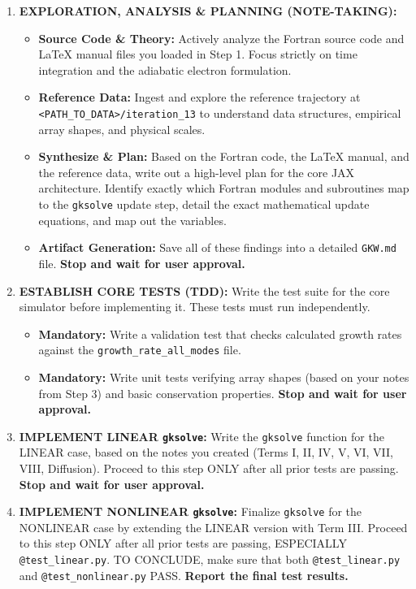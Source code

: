 \documentclass{article}
\theoremstyle{plain}
\theoremstyle{definition}
\theoremstyle{remark}
\begin{document}
\begin{promptbox}[]
\begin{enumerate}[leftmargin=*, noitemsep, topsep=0pt]
    \item \textbf{EXPLORATION, ANALYSIS \& PLANNING (NOTE-TAKING):}
    \begin{itemize}[leftmargin=*, noitemsep, topsep=0pt]
        \item \textbf{Source Code \& Theory:} Actively analyze the Fortran source code and LaTeX manual files you loaded in Step 1. Focus strictly on time integration and the adiabatic electron formulation.
        \item \textbf{Reference Data:} Ingest and explore the reference trajectory at \texttt{<PATH\_TO\_DATA>/iteration\_13} to understand data structures, empirical array shapes, and physical scales.
        \item \textbf{Synthesize \& Plan:} Based on the Fortran code, the LaTeX manual, and the reference data, write out a high-level plan for the core JAX architecture. Identify exactly which Fortran modules and subroutines map to the \texttt{gksolve} update step, detail the exact mathematical update equations, and map out the variables.
        \item \textbf{Artifact Generation:} Save all of these findings into a detailed \texttt{GKW.md} file. \textbf{Stop and wait for user approval.}
    \end{itemize}
    
    \item \textbf{ESTABLISH CORE TESTS (TDD):} Write the test suite for the core simulator before implementing it. These tests must run independently.
    \begin{itemize}[leftmargin=*, noitemsep, topsep=0pt]
        \item \textbf{Mandatory:} Write a validation test that checks calculated growth rates against the \texttt{growth\_rate\_all\_modes} file.
        \item \textbf{Mandatory:} Write unit tests verifying array shapes (based on your notes from Step 3) and basic conservation properties. \textbf{Stop and wait for user approval.}
    \end{itemize}
    
    \item \textbf{IMPLEMENT LINEAR \texttt{gksolve}:} Write the \texttt{gksolve} function for the LINEAR case, based on the notes you created (Terms I, II, IV, V, VI, VII, VIII, Diffusion). Proceed to this step ONLY after all prior tests are passing. \textbf{Stop and wait for user approval.}
    
    \item \textbf{IMPLEMENT NONLINEAR \texttt{gksolve}:} Finalize \texttt{gksolve} for the NONLINEAR case by extending the LINEAR version with Term III. Proceed to this step ONLY after all prior tests are passing, ESPECIALLY \texttt{@test\_linear.py}. TO CONCLUDE, make sure that both \texttt{@test\_linear.py} and \texttt{@test\_nonlinear.py} PASS. \textbf{Report the final test results.}
\end{enumerate}
\end{promptbox}
\end{document}
